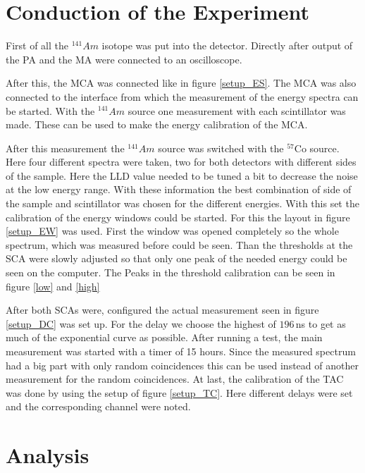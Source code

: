 \documentclass[30pt,a4paper]{article}
\begin{document}
 	\section{Conduction of the Experiment}
 	First of all the $^{141}Am$ isotope was put into the detector. Directly after output of the PA and the MA were connected to an oscilloscope.\par
 	After this, the MCA was connected like in figure \ref{setup_ES}. The MCA was also connected to the interface from which the measurement of the energy spectra can be started. With the $^{141}Am$ source one measurement with each scintillator was made. These can be used to make the energy calibration of the MCA.\par
 	After this measurement the  $^{141}Am$ source was switched with the $^{57}$Co source. Here four different spectra were taken, two for both detectors with different sides of the sample. Here the LLD value needed to be tuned a bit to decrease the noise at the low energy range. With these information the best combination of side of the sample and scintillator was chosen for the different energies. With this set the calibration of the energy windows could be started. For this the layout in figure \ref{setup_EW} was used. First the window was opened completely so the whole spectrum, which was measured before could be seen. Than the thresholds at the SCA were slowly adjusted so that only one peak of the needed energy could be seen on the computer. The Peaks in the threshold calibration can be seen in figure \ref{low} and \ref{high}\par
 	After both SCAs were, configured the actual measurement seen in figure \ref{setup_DC} was set up. For the delay we choose the highest of $196$\,ns to get as much of the exponential curve as possible. After running a test, the main measurement was started with a timer of 15 hours. Since the measured spectrum had a big part with only random coincidences this can be used instead of another measurement for the random coincidences. At last, the calibration of the TAC was done by using the setup of figure \ref{setup_TC}. Here different delays were set and the corresponding channel were noted.
 	\section{Analysis}
\end{document}
